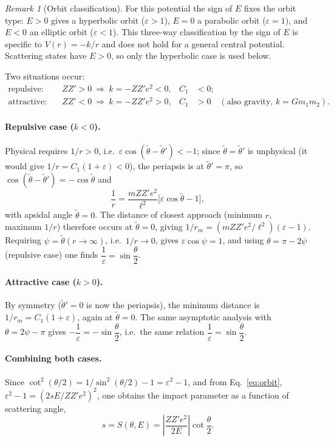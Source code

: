 \documentclass[11pt]{article}
\theoremstyle{remark}
\newtheorem{remark}{Remark}
\begin{document}
\begin{remark}[Orbit classification]
For this potential the sign of $E$ fixes the orbit type: $E>0$ gives a
hyperbolic orbit ($\varepsilon>1$), $E=0$ a parabolic orbit ($\varepsilon=1$),
and $E<0$ an elliptic orbit ($\varepsilon<1$). This three-way classification
by the sign of $E$ is specific to $V(r)=-k/r$ and does not hold for a general
central potential. Scattering states have $E>0$, so only the hyperbolic case
is used below.
\end{remark}

Two situations occur:
\begin{align}
  \text{repulsive:}\quad & ZZ' > 0 \ \Rightarrow\ k = -ZZ'e^2 < 0, & C_1 &< 0; \\
  \text{attractive:}\quad & ZZ' < 0 \ \Rightarrow\ k = -ZZ'e^2 > 0, & C_1 &> 0
  \quad(\text{also gravity, } k = Gm_1m_2).
\end{align}

\paragraph{Repulsive case ($k<0$).} Physical requires $1/r>0$, i.e.\
$\varepsilon\cos(\tilde\theta-\tilde\theta') < -1$; since $\tilde\theta=\tilde\theta'$
is unphysical (it would give $1/r = C_1(1+\varepsilon) < 0$), the periapsis is
at $\tilde\theta'=\pi$, so $\cos(\tilde\theta-\tilde\theta') = -\cos\tilde\theta$
and
\[
  \frac{1}{r} = \frac{mZZ'e^2}{\ell^2}\big[\varepsilon\cos\tilde\theta - 1\big],
\]
with apsidal angle $\tilde\theta=0$. The distance of closest approach
(minimum $r$, maximum $1/r$) therefore occurs at $\tilde\theta=0$, giving
$1/r_m = (mZZ'e^2/\ell^2)(\varepsilon-1)$. Requiring $\psi = \tilde\theta(r\to\infty)$,
i.e.\ $1/r\to0$, gives $\varepsilon\cos\psi = 1$, and using $\theta=\pi-2\psi$
(repulsive case) one finds $\dfrac1\varepsilon = \sin\dfrac\theta2$.

\paragraph{Attractive case ($k>0$).} By symmetry ($\tilde\theta'=0$ is now the
periapsis), the minimum distance is $1/r_m = C_1(1+\varepsilon)$, again at
$\tilde\theta=0$. The same asymptotic analysis with $\theta = 2\psi-\pi$ gives
$-\dfrac1\varepsilon = -\sin\dfrac\theta2$, i.e.\ the same relation
$\dfrac1\varepsilon = \sin\dfrac\theta2$.

\paragraph{Combining both cases.} Since $\cot^2(\theta/2) = 1/\sin^2(\theta/2) - 1
= \varepsilon^2 - 1$, and from Eq.~\eqref{eq:orbit},
$\varepsilon^2 - 1 = (2sE/ZZ'e^2)^2$, one obtains the impact parameter as a
function of scattering angle,
\begin{equation}
  \boxed{s = S(\theta,E) = \left|\frac{ZZ'e^2}{2E}\right|\cot\frac{\theta}{2}}.
  \label{eq:s-of-theta}
\end{equation}
\end{document}
